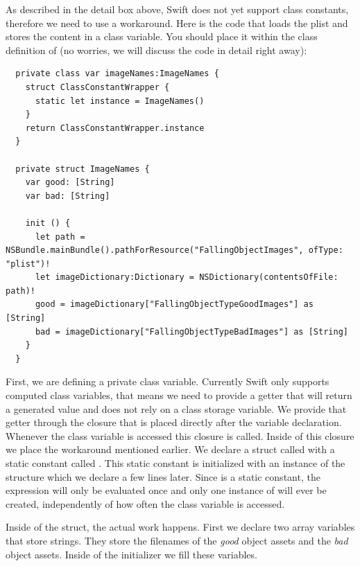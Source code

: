 As described in the detail box above, Swift does not yet support class
constants, therefore we need to use a workaround. Here is the code that loads
the plist and stores the content in a class variable. You should place it within
the class definition of  (no worries, we will discuss
the code in detail right away):

\begin{lstlisting}
  private class var imageNames:ImageNames {
    struct ClassConstantWrapper {
      static let instance = ImageNames()
    }
    return ClassConstantWrapper.instance
  }
  
  private struct ImageNames {
    var good: [String]
    var bad: [String]
    
    init () {
      let path = NSBundle.mainBundle().pathForResource("FallingObjectImages", ofType: "plist")!
      let imageDictionary:Dictionary = NSDictionary(contentsOfFile: path)!
      good = imageDictionary["FallingObjectTypeGoodImages"] as [String]
      bad = imageDictionary["FallingObjectTypeBadImages"] as [String]
    }
  }
\end{lstlisting}

First, we are defining a private class variable. Currently Swift only supports
computed class variables, that means we need to provide a getter that will
return a generated value and does not rely on a class storage variable. We
provide that getter through the closure that is placed directly after the 
variable declaration. Whenever the class variable is accessed
this closure is called. Inside of this closure we place the workaround mentioned
earlier. We declare a struct called  with a
static constant called . This static constant is initialized with an instance of
the structure  which we declare a few lines later. Since
 is a static constant, the expression will only be
evaluated once and only one instance of  will ever be
created, independently of how often the class variable is accessed.

Inside of the  struct, the actual work happens. First we
declare two array variables that store strings. They store the filenames of the
\textit{good} object assets and the \textit{bad} object assets. Inside of the
initializer we fill these variables.

